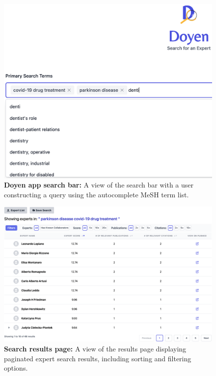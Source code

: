 \begin{figure}[ht!]
    \tiny
    \centering
    \includegraphics[width=\figwidth]{Images/ui-searchbar.png}
    \caption[Doyen App Search Bar]{\textbf{Doyen app search bar:} A view of the search bar with a user constructing a query using the autocomplete MeSH term list.}
    \label{fig:ui-searchbar}
\end{figure}

\begin{figure}[ht!]
    \tiny
    \centering
    \includegraphics[width=\figwidth]{Images/ui-results.png}
    \caption[Search Results Page]{\textbf{Search results page:} A view of the results page displaying paginated expert search results, including sorting and filtering options.}
    \label{fig:ui-results}
\end{figure}

